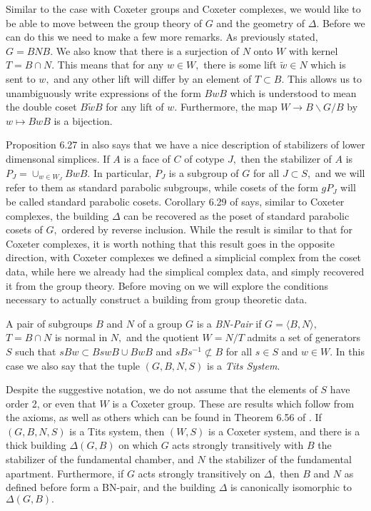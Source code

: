 \documentclass[class=book, crop=false,12 pt]{standalone}
\begin{document}
Similar to the case with Coxeter groups and Coxeter complexes, we would like to be able to move between the group theory of $G$ and the geometry of $\Delta.$ Before we can do this we need to make a few more remarks. As previously stated, $G=BNB.$ We also know that there is a surjection of $N$ onto $W$ with kernel $T=B\cap N.$ This means that for any $w\in W,$ there is some lift $\tilde{w}\in N$ which is sent to $w,$ and any other lift will differ by an element of $T\subset B.$ This allows us to unambiguously write expressions of the form $BwB$ which is understood to mean the double coset $B\tilde{w}B$ for any lift of $w.$ Furthermore, the map $W\to B\backslash G/B$ by $w\mapsto BwB$ is a bijection.

Proposition 6.27 in \cite{buildings} also says that we have a nice description of stabilizers of lower dimensonal simplices. If $A$ is a face of $C$ of cotype $J,$ then the stabilizer of $A$ is $P_J=\cup_{w\in W_J}BwB.$ In particular, $P_J$ is a subgroup of $G$ for all $J\subset S,$ and we will refer to them as standard parabolic subgroups, while cosets of the form $gP_J$ will be called standard parabolic cosets. Corollary 6.29 of \cite{buildings} says, similar to Coxeter complexes, the building $\Delta$ can be recovered as the poset of standard parabolic cosets of $G,$ ordered by reverse inclusion. While the result is similar to that for Coxeter complexes, it is worth nothing that this result goes in the opposite direction, with Coxeter complexes we defined a simplicial complex from the coset data, while here we already had the simplical complex data, and simply recovered it from the group theory. Before moving on we will explore the conditions necessary to actually construct a building from group theoretic data.

\begin{defn}
	\label{defn:bnpair}
	A pair of subgroups $B$ and $N$ of a group $G$ is a \emph{BN-Pair} if $G=\langle B,N\rangle,$ $T=B\cap N$ is normal in $N,$ and the quotient $W=N/T$ admits a set of generators $S$ such that $sBw\subset BswB\cup BwB$ and $sBs^{-1}\not\subset B$ for all $s\in S$ and $w\in W.$ In this case we also say that the tuple $(G,B,N,S)$ is a \emph{Tits System}.
\end{defn}

Despite the suggestive notation, we do not assume that the elements of $S$ have order 2, or even that $W$ is a Coxeter group. These are results which follow from the axioms, as well as others which can be found in Theorem 6.56 of \cite{buildings}. If $(G,B,N,S)$ is a Tits system, then $(W,S)$ is a Coxeter system, and there is a thick building $\Delta(G,B)$ on which $G$ acts strongly transitively with $B$ the stabilizer of the fundamental chamber, and $N$ the stabilizer of the fundamental apartment. Furthermore, if $G$ acts strongly transitively on $\Delta,$ then $B$ and $N$ as defined before form a BN-pair, and the building $\Delta$ is canonically isomorphic to $\Delta(G,B).$
\end{document}
